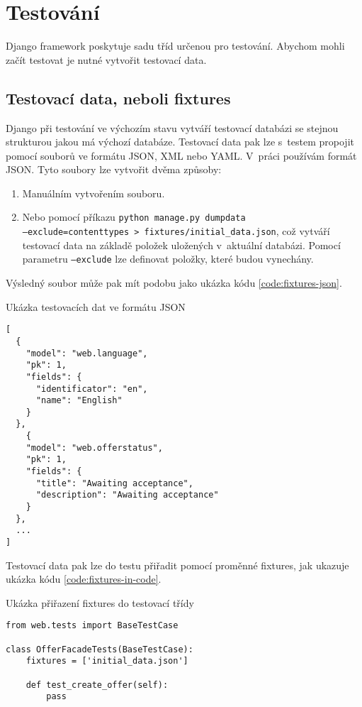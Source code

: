 \section{Testování}
Django framework poskytuje sadu tříd určenou pro testování. Abychom mohli začít testovat je nutné vytvořit testovací data.

\subsection{Testovací data, neboli fixtures}
\begin{sloppypar}
Django při testování ve výchozím stavu vytváří testovací databázi se stejnou strukturou jakou má výchozí databáze. Testovací data pak lze s~testem propojit pomocí souborů ve formátu JSON, XML nebo YAML. V~práci používám formát JSON. Tyto soubory lze vytvořit dvěma způsoby:

\begin{enumerate}
    \item Manuálním vytvořením souboru.
    \item Nebo pomocí příkazu \texttt{python manage.py dumpdata \\--exclude=contenttypes > fixtures/initial\_data.json}, což vytváří testovací data na základě položek uložených v~aktuální databázi. Pomocí parametru \texttt{--exclude} lze definovat položky, které budou vynechány.
\end{enumerate}

Výsledný soubor může pak mít podobu jako ukázka kódu \ref{code:fixtures-json}.

\begin{listing}[h]
\caption{\label{code:fixtures-json}Ukázka testovacích dat ve formátu JSON}
\begin{verbatim}
[
  {
    "model": "web.language",
    "pk": 1,
    "fields": {
      "identificator": "en",
      "name": "English"
    }
  },
    {
    "model": "web.offerstatus",
    "pk": 1,
    "fields": {
      "title": "Awaiting acceptance",
      "description": "Awaiting acceptance"
    }
  },
  ...
]
\end{verbatim}
\end{listing}

Testovací data pak lze do testu přiřadit pomocí proměnné fixtures, jak ukazuje ukázka kódu \ref{code:fixtures-in-code}.

\begin{listing}[h]
\caption{\label{code:fixtures-in-code}Ukázka přiřazení fixtures do testovací třídy}
\begin{verbatim}
from web.tests import BaseTestCase

class OfferFacadeTests(BaseTestCase):
    fixtures = ['initial_data.json']

    def test_create_offer(self):
        pass
\end{verbatim}
\end{listing}
\end{sloppypar}

